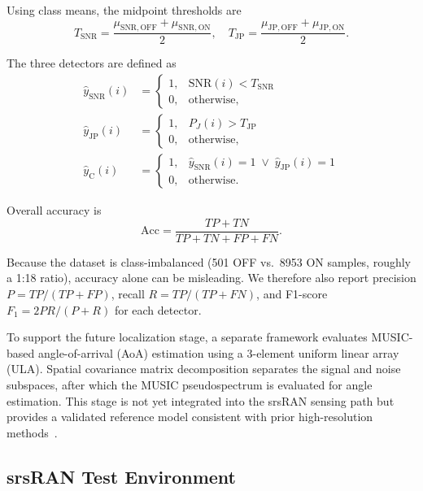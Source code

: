 \documentclass[conference]{IEEEtran}
\begin{document}
Using class means, the midpoint thresholds are
\begin{equation}
T_{\mathrm{SNR}} = \frac{\mu_{\mathrm{SNR,OFF}} + \mu_{\mathrm{SNR,ON}}}{2}, \quad
T_{\mathrm{JP}} = \frac{\mu_{\mathrm{JP,OFF}} + \mu_{\mathrm{JP,ON}}}{2}.
\end{equation}

The three detectors are defined as
\begin{align}
\hat{y}_{\mathrm{SNR}}(i) &=
\begin{cases} 1, & \mathrm{SNR}(i) < T_{\mathrm{SNR}} \\ 0, & \text{otherwise,} \end{cases}
\label{eq:snr_det} \\
\hat{y}_{\mathrm{JP}}(i) &=
\begin{cases} 1, & P_J(i) > T_{\mathrm{JP}} \\ 0, & \text{otherwise,} \end{cases}
\label{eq:jp_det} \\
\hat{y}_{\mathrm{C}}(i) &=
\begin{cases} 1, & \hat{y}_{\mathrm{SNR}}(i)=1 \;\lor\; \hat{y}_{\mathrm{JP}}(i)=1 \\ 0, & \text{otherwise.} \end{cases}
\label{eq:combined_det}
\end{align}

Overall accuracy is
\begin{equation}
\mathrm{Acc} = \frac{TP + TN}{TP + TN + FP + FN}.
\label{eq:accuracy}
\end{equation}


Because the dataset is class-imbalanced (501 OFF vs.\ 8953 ON samples,
roughly a 1:18 ratio), accuracy alone can be misleading. We therefore
also report precision $P = TP/(TP+FP)$, recall $R = TP/(TP+FN)$, and
F1-score $F_1 = 2PR/(P+R)$ for each detector.

To support the future localization stage, a separate framework evaluates
MUSIC-based angle-of-arrival (AoA) estimation using a 3-element uniform
linear array (ULA). Spatial covariance matrix decomposition separates the
signal and noise subspaces, after which the MUSIC pseudospectrum is
evaluated for angle estimation. This stage is not yet integrated into the
srsRAN sensing path but provides a validated reference model consistent
with prior high-resolution methods~\cite{1143830,45540,32276,inbook}.

\subsection{srsRAN Test Environment}
\end{document}
